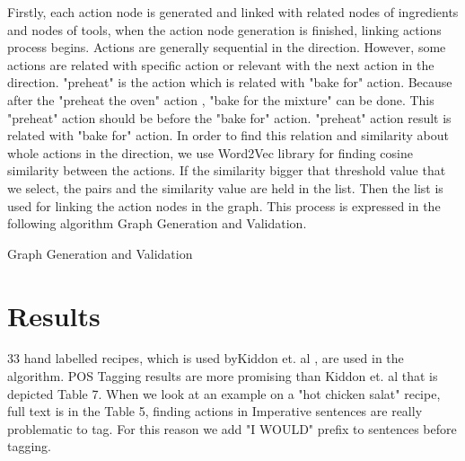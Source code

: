 Firstly, each action node is generated and linked with related nodes of ingredients and nodes of tools, when the action node generation is finished, linking actions process begins. Actions are generally sequential in the direction. However, some actions are related with specific action or relevant with the next action in the direction. "preheat" is the action which is related with "bake for" action. Because after  the "preheat the oven" action , "bake for the mixture" can be done. This "preheat" action should be before the "bake for" action. "preheat" action  result is related with "bake for" action. In order to find this relation and similarity about whole actions in the direction, we use Word2Vec library for finding cosine similarity between the actions. If the similarity bigger that threshold value that we select, the pairs and the similarity value are held  in the list. Then the list is used for linking the action nodes in the graph. This process is expressed in the following algorithm Graph Generation and Validation. 



\begin{algorithm}
\caption{Graph Generation and Validation}
\label{alg:generateGraph}
\end{algorithm}
        

\section{Results}

33 hand labelled recipes, which is used byKiddon et. al \cite{kiddon2015mise},  are used  in the algorithm. POS Tagging results are more promising than Kiddon et. al \cite{kiddon2015mise} that is depicted Table 7. When we look at an example on a "hot chicken salat" recipe, full text is in the Table 5, finding actions in Imperative sentences are really problematic to tag. For this reason we add "I WOULD" prefix to sentences before tagging. 



